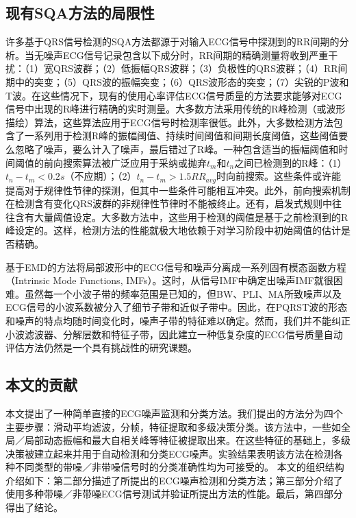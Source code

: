 \subsection{现有SQA方法的局限性}
许多基于QRS信号检测的SQA方法都源于对输入ECG信号中探测到的RR间期的分析。当无噪声ECG信号记录包含以下成分时，RR间期的精确测量将收到严重干扰：（1）宽QRS波群；（2）低振幅QRS波群；（3）负极性的QRS波群；（4）RR间期中的突变；（5）QRS波的振幅突变；（6）QRS波形态的突变；（7）尖锐的P波和T波。在这些情况下，现有的使用心率评估ECG信号质量的方法要求能够对ECG信号中出现的R峰进行精确的实时测量。大多数方法采用传统的R峰检测（或波形描绘）算法，这些算法应用于ECG信号时检测率很低。此外，大多数检测方法包含了一系列用于检测R峰的振幅阈值、持续时间阈值和间期长度阈值，这些阈值要么忽略了噪声，要么计入了噪声，最后错过了R峰。一种包含适当的振幅阈值和时间阈值的前向搜索算法被广泛应用于采纳或抛弃$t_{m}$和$t_{n}$之间已检测到的R峰：（1）$t_{n}-t_{m}<0.2 s$（不应期）；（2）$t_{n}-t_{m}>1.5RR_{avg}$时向前搜索。这些条件或许能提高对于规律性节律的探测，但其中一些条件可能相互冲突。此外，前向搜索机制在检测含有变化QRS波群的非规律性节律时不能被终止。还有，启发式规则中往往含有大量阈值设定。大多数方法中，这些用于检测的阈值是基于之前检测到的R峰设定的。这样，检测方法的性能就极大地依赖于对学习阶段中初始阈值的估计是否精确。

基于EMD的方法将局部波形中的ECG信号和噪声分离成一系列固有模态函数方程（Intrinsic Mode Functions, IMFs）。这时，从信号IMF中确定出噪声IMF就很困难。虽然每一个小波子带的频率范围是已知的，但BW、PLI、MA所致噪声以及ECG信号的小波系数被分入了细节子带和近似子带中。因此，在PQRST波的形态和噪声的特点均随时间变化时，噪声子带的特征难以确定。然而，我们并不能纠正小波滤波器、分解层数和特征子带，因此建立一种低复杂度的ECG信号质量自动评估方法仍然是一个具有挑战性的研究课题。


\subsection{本文的贡献}

本文提出了一种简单直接的ECG噪声监测和分类方法。我们提出的方法分为四个主要步骤：滑动平均滤波，分帧，特征提取和多级决策分类。该方法中，一些如全局／局部动态振幅和最大自相关峰等特征被提取出来。在这些特征的基础上，多级决策被建立起来并用于自动检测和分类ECG噪声。实验结果表明该方法在检测各种不同类型的带噪／非带噪信号时的分类准确性均为可接受的。
本文的组织结构介绍如下：第二部分描述了所提出的ECG噪声检测和分类方法；第三部分介绍了使用多种带噪／非带噪ECG信号测试并验证所提出方法的性能。最后，第四部分得出了结论。